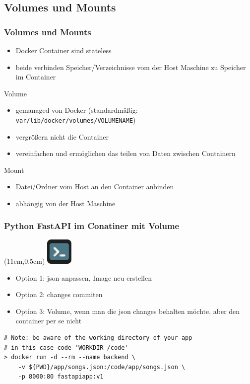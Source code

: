 \documentclass[22pt]{beamer}
\newcommand{\code}[1]{\colorbox{gray!10}{\texttt{#1}}}
\newcommand{\terminal}{
    \begin{textblock*}{1.3cm}(11cm,0.5cm) %
    \includegraphics[width=1.3cm]{Bilder/terminal2.png}
    \end{textblock*}
}
\begin{document}
\subsection{Volumes und Mounts}
\begin{frame}[t]
    \frametitle{Volumes und Mounts}
    \begin{itemize}
        \item Docker Container sind stateless
        \item beide verbinden Speicher/Verzeichnisse vom der Host Maschine zu Speicher im Container
    \end{itemize} \pause
    \begin{block}{Volume}
        \begin{itemize}
            \item gemanaged von Docker (standardmäßig: \code{var/lib/docker/volumes/VOLUMENAME})
            \item vergrößern nicht die Container
            \item vereinfachen und ermöglichen das teilen von Daten zwischen Containern
        \end{itemize}
    \end{block} \pause
    \begin{block}{Mount}
        \begin{itemize}
            \item Datei/Ordner vom Host an den Container anbinden
            \item abhängig von der Host Maschine
        \end{itemize}
    \end{block}
\end{frame}

\begin{frame}[fragile]
    \frametitle{Python FastAPI im Conatiner mit Volume}
    \terminal
    \begin{itemize}
        \item Option 1: json anpassen, Image neu erstellen
        \item Option 2: changes commiten
        \item Option 3: Volume, wenn man die json changes behalten möchte, aber den container per se nicht
    \end{itemize}
\vspace{0.8cm}
\begin{verbatim}
# Note: be aware of the working directory of your app
# in this case code 'WORKDIR /code'
> docker run -d --rm --name backend \
    -v ${PWD}/app/songs.json:/code/app/songs.json \
    -p 8000:80 fastapiapp:v1 
\end{verbatim}
            
\end{frame}
\end{document}
